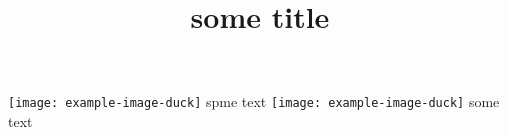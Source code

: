 \documentclass{article}
\title{some title}
\begin{document}
\parskip=1cm
%
\texttt{[image: example-image-duck]}
spme text\newpage 
\texttt{[image: example-image-duck]}
some text
\end{document}
